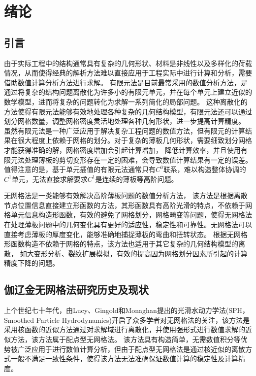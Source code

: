 \chapter{绪论}
\section{引言}
由于实际工程中的结构通常具有复杂的几何形状、材料是非线性以及多样化的荷载情况，从而使得经典的解析方法难以直接应用于工程实际中进行计算和分析，需要借助数值计算分析方法进行求解。
有限元法\cite{hughes2000,2014Computer,steinEncyclopediaComputationalMechanics2018,2013Nonlinear}是目前最常采用的数值分析方法，是通过将复杂的结构问题离散化为许多小的有限元单元，并在每个单元上建立近似的数学模型，进而将复杂的问题转化为求解一系列简化的局部问题。
这种离散化的方法使得有限元法能够有效地处理各种复杂的几何结构模型，有限元法还可以通过划分网格数量，调整网格密度灵活地处理各种几何形状，进一步提高计算精度。
虽然有限元法是一种广泛应用于解决复杂工程问题的数值方法，但有限元的计算结果在很大程度上依赖于网格的划分。对于复杂的薄板几何形状，需要细致划分网格才能获得准确的解，网格密度增加会引起计算增加， 降低计算效率，并且使用有限元法处理薄板的剪切变形存在一定的困难，会导致数值计算结果有一定的误差。
值得注意的是，基于单元插值的有限元法通常只有$C^0$联系，难以构造整体协调的$C^1$单元，无法直接求解要求$C^1$是连续的薄板等高阶问题。

无网格法\cite{chenMeshfreeMethodsProgress2017,belytschkoMeshlessMethodsOverview1996b}是一类能够有效解决高阶薄板问题的数值分析方法，
该方法是根据离散节点位置信息直接建立形函数的方法，其形函数具有高阶光滑的特点，不依赖于网格单元信息构造形函数，有效的避免了网格划分，网格畸变等问题，使得无网格法在处理薄板问题\cite{邓立克2019薄板分析的线性基梯度光滑伽辽金无网格法}中的几何变化具有更好的适应性，稳定性和可靠性。无网格法可以直接考虑薄板的厚度变化，能够准确地捕捉薄板的弯曲和扭转状态。
根据无网格形函数构造不依赖于网格的特点，该方法也适用于其它复杂的几何结构模型的离散，
如大变形分析\cite{陈嵩涛2020几何非线性分析的高效高阶无网格法}、裂纹扩展模拟\cite{GaoXin2018}，有效的提高因为网格划分因素所引起的计算精度下降的问题。

\section{伽辽金无网格法研究历史及现状}
上个世纪七十年代，由Lucy\cite{1977A}、Gingold和Monaghan\cite{gingold1977}提出的光滑水动力学法(SPH，Smoothed Particle Hydrodynamics)开启了众多学者对无网格法的关注，该方法是采用核函数的近似方法通过对求解域进行离散化，并使用强形式进行数值求解的近似方法，该方法属于配点型无网格法。
该方法具有构造简单，无需数值积分等优势被广泛应用于进行数值计算分析，但由于配点型无网格法是通过核近似的离散方式一般不满足一致性条件，使得该方法无法准确保证数值计算的稳定性及计算精度\cite{auricchio2010a,wang2018a,wang2020,gomez2016}。

